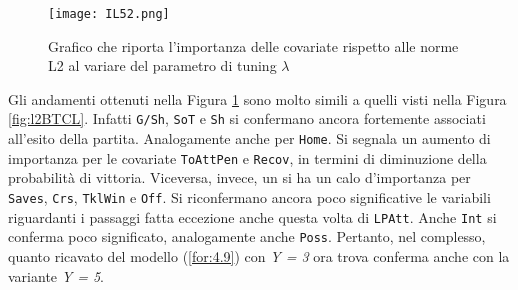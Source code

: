 \begin{figure}[]
	\begin{center}
		\texttt{[image: IL52.png]}
		\caption{Grafico che riporta l'importanza delle covariate rispetto alle norme L2 al variare del parametro di tuning $\lambda$} \label{fig:IL52}
	\end{center}
\end{figure}
Gli andamenti ottenuti nella Figura \ref{fig:IL52} sono molto simili a quelli visti nella Figura \ref{fig:l2BTCL}. Infatti \texttt{G/Sh}, \texttt{SoT} e \texttt{Sh} si confermano ancora fortemente associati all'esito della partita. Analogamente anche per \texttt{Home}. Si segnala un aumento di importanza per le covariate \texttt{ToAttPen} e \texttt{Recov}, in termini di diminuzione della probabilità di vittoria. Viceversa, invece, un si ha un calo d'importanza per \texttt{Saves}, \texttt{Crs}, \texttt{TklWin} e \texttt{Off}. Si riconfermano ancora poco significative le variabili riguardanti i passaggi fatta eccezione anche questa volta di \texttt{LPAtt}. Anche \texttt{Int} si conferma poco significato, analogamente anche \texttt{Poss}.
Pertanto, nel complesso, quanto ricavato del modello (\ref{for:4.9}) con \emph{Y = 3} ora trova conferma anche con la variante \emph{Y = 5}.


